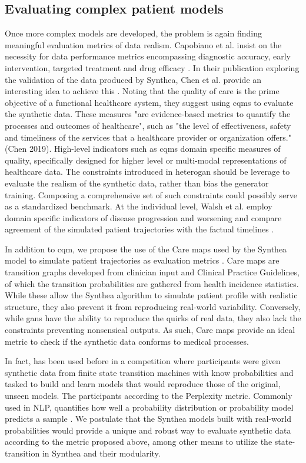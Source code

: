 \subsection{Evaluating complex patient models \label{sec:evaluation-cqm}}
Once more complex models are developed, the problem is again finding meaningful evaluation metrics of data realism. Capobiano et al. insist on the necessity for data performance metrics encompassing diagnostic accuracy, early intervention, targeted treatment and drug efficacy \cite{Capobianco2020}. In their publication exploring the validation of the data produced by Synthea, Chen et al. provide an interesting idea to achieve this \cite{Chen_2019}. Noting that the quality of care is the prime objective of a functional healthcare system, they suggest using \glspl{cqm} to evaluate the synthetic data. These measures "are evidence-based metrics to quantify the processes and outcomes of healthcare", such as "the level of effectiveness, safety and timeliness of the services that a healthcare provider or organization offers."(Chen 2019). High-level indicators such as \glspl{cqm} domain specific measures of quality, specifically designed for higher level or multi-modal representations of healthcare data. The constraints introduced in \gls{heterogan} should be leverage to evaluate the realism of the synthetic data, rather than bias the generator training. Composing a comprehensive set of such constraints could possibly serve as a standardized benchmark.
At the individual level, Walsh et al. employ domain specific indicators of disease progression and worsening and compare agreement of the simulated patient trajectories with the factual timelines \cite{walsh2020generating}.\par
In addition to \gls{cqm}, we propose the use of the Care maps used by the Synthea model to simulate patient trajectories as evaluation metrics \cite{Walonoski_2017}. Care maps are transition graphs developed from clinician input and Clinical Practice Guidelines, of which the transition probabilities are gathered from health incidence statistics. While these allow the Synthea algorithm to simulate patient profile with realistic structure, they also prevent it from reproducing real-world variability. Conversely, while \glspl{gan} have the ability to reproduce the quirks of real data, they also lack the constraints preventing nonsensical outputs. As such, Care maps provide an ideal metric to check if the synthetic data conforms to medical processes.\par 
In fact, has been used before in a competition where participants were given synthetic data from finite state transition machines with know probabilities and tasked to build and learn models that would reproduce those of the original, unseen models. The participants according to the Perplexity metric. Commonly used in NLP, quantifies how well a probability distribution or probability model predicts a sample \cite{Verwer_2013}. We postulate that the Synthea models built with real-world probabilities would provide a unique and robust way to evaluate synthetic data according to the metric proposed above, among other means to utilize the state-transition in Synthea and their modularity.


